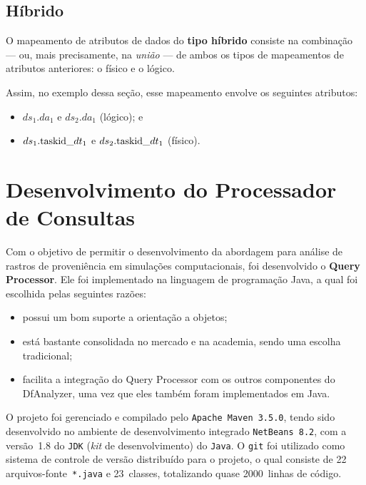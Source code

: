 \subsection{Híbrido}

O mapeamento de atributos de dados do \textbf{tipo híbrido} consiste na combinação --- ou, mais precisamente, na \emph{união} --- de ambos os tipos de mapeamentos de atributos anteriores: o físico e o lógico.


Assim, no exemplo dessa seção, esse mapeamento envolve os seguintes atributos:

\begin{itemize}
    \item \(ds_1.da_1\) e \(ds_2.da_1\) (lógico); e
    \item \(ds_1.\textup{taskid\_}dt_1\) e \(ds_2.\textup{taskid\_}dt_1\) (físico).
\end{itemize}

\section{Desenvolvimento do Processador de Consultas}

Com o objetivo de permitir o desenvolvimento da abordagem para análise de rastros de proveniência em simulações computacionais, foi desenvolvido o \textbf{Query Processor}. Ele foi implementado na linguagem de programação Java, a qual foi escolhida pelas seguintes razões:

\begin{itemize}
    \item possui um bom suporte a orientação a objetos;
    \item está bastante consolidada no mercado e na academia, sendo uma escolha tradicional;
    \item facilita a integração do Query Processor com os outros componentes do DfAnalyzer, uma vez que eles também foram implementados em Java.
\end{itemize}

O projeto foi gerenciado e compilado pelo \texttt{Apache Maven~3.5.0}, tendo sido desenvolvido no ambiente de desenvolvimento integrado \texttt{NetBeans~8.2}, com a versão~1.8 do \texttt{JDK} (\textit{kit} de desenvolvimento) do \texttt{Java}. O \texttt{git} foi utilizado como sistema de controle de versão distribuído para o projeto, o qual consiste de
22 arquivos-fonte~\texttt{*.java} e 23~classes, totalizando quase 2000~linhas de código.

